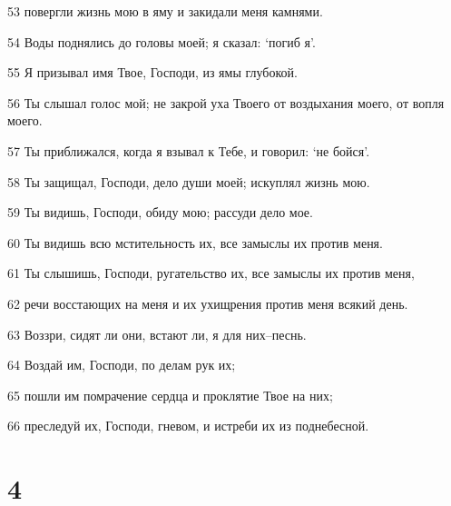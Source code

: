 \par 53 повергли жизнь мою в яму и закидали меня камнями.
\par 54 Воды поднялись до головы моей; я сказал: `погиб я'.
\par 55 Я призывал имя Твое, Господи, из ямы глубокой.
\par 56 Ты слышал голос мой; не закрой уха Твоего от воздыхания моего, от вопля моего.
\par 57 Ты приближался, когда я взывал к Тебе, и говорил: `не бойся'.
\par 58 Ты защищал, Господи, дело души моей; искуплял жизнь мою.
\par 59 Ты видишь, Господи, обиду мою; рассуди дело мое.
\par 60 Ты видишь всю мстительность их, все замыслы их против меня.
\par 61 Ты слышишь, Господи, ругательство их, все замыслы их против меня,
\par 62 речи восстающих на меня и их ухищрения против меня всякий день.
\par 63 Воззри, сидят ли они, встают ли, я для них--песнь.
\par 64 Воздай им, Господи, по делам рук их;
\par 65 пошли им помрачение сердца и проклятие Твое на них;
\par 66 преследуй их, Господи, гневом, и истреби их из поднебесной.

\chapter{4}

